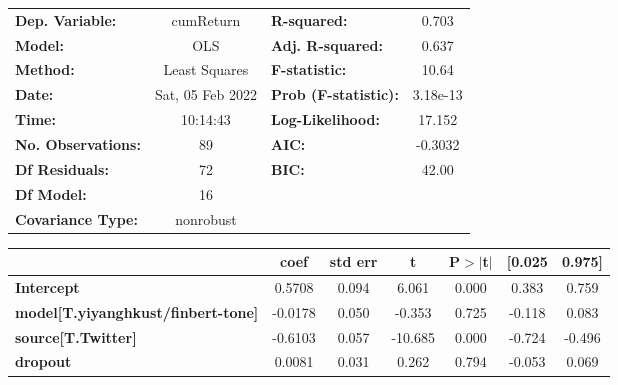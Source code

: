\begin{center}
\begin{tabular}{lclc}
\toprule
\textbf{Dep. Variable:}                    &    cumReturn     & \textbf{  R-squared:         } &     0.703   \\
\textbf{Model:}                            &       OLS        & \textbf{  Adj. R-squared:    } &     0.637   \\
\textbf{Method:}                           &  Least Squares   & \textbf{  F-statistic:       } &     10.64   \\
\textbf{Date:}                             & Sat, 05 Feb 2022 & \textbf{  Prob (F-statistic):} &  3.18e-13   \\
\textbf{Time:}                             &     10:14:43     & \textbf{  Log-Likelihood:    } &    17.152   \\
\textbf{No. Observations:}                 &          89      & \textbf{  AIC:               } &   -0.3032   \\
\textbf{Df Residuals:}                     &          72      & \textbf{  BIC:               } &     42.00   \\
\textbf{Df Model:}                         &          16      & \textbf{                     } &             \\
\textbf{Covariance Type:}                  &    nonrobust     & \textbf{                     } &             \\
\bottomrule
\end{tabular}
\begin{tabular}{lcccccc}
                                           & \textbf{coef} & \textbf{std err} & \textbf{t} & \textbf{P$> |$t$|$} & \textbf{[0.025} & \textbf{0.975]}  \\
\midrule
\textbf{Intercept}                         &       0.5708  &        0.094     &     6.061  &         0.000        &        0.383    &        0.759     \\
\textbf{model[T.yiyanghkust/finbert-tone]} &      -0.0178  &        0.050     &    -0.353  &         0.725        &       -0.118    &        0.083     \\
\textbf{source[T.Twitter]}                 &      -0.6103  &        0.057     &   -10.685  &         0.000        &       -0.724    &       -0.496     \\
\textbf{dropout}                           &       0.0081  &        0.031     &     0.262  &         0.794        &       -0.053    &        0.069     \\

\end{tabular}
\end{center}
